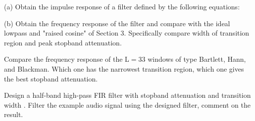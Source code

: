 \documentclass{article}
\begin{document}
\begin{CellGroup}
\begin{CellGroup}
(a) Obtain the impulse response of a filter defined by the following equations:

\begin{CellGroup}
(b) Obtain the frequency response of the filter and compare with the ideal lowpass and "raised cosine" of Section 3. Specifically compare width of
transition region and peak stopband attenuation.


\end{CellGroup}

\end{CellGroup}
\begin{CellGroup}
Compare the frequency response of the L\(=\)33 windows of type Bartlett, Hann, and Blackman. Which one has the narrowest transition region, which
one gives the best stopband attenuation. 


\end{CellGroup}
\begin{CellGroup}
Design a half-band high-pass FIR filter with stopband attenuation  and transition width
 \inlineTFinmath{\Mvariable{\Delta \omega }\leq \multsp 0.12\multsp \pi }. Filter the example audio signal using the designed filter, comment on
the result.




\end{CellGroup}

\end{CellGroup}
\end{document}
